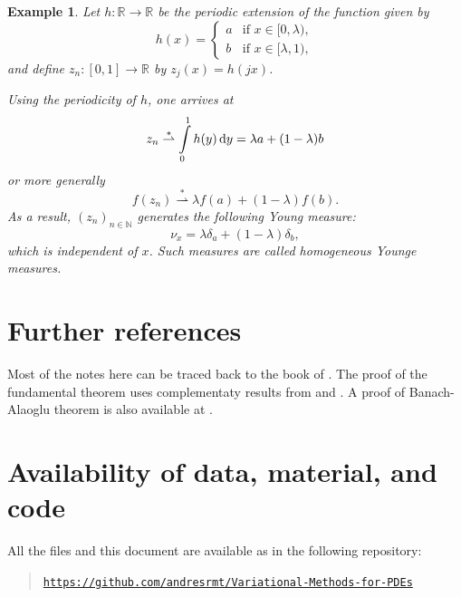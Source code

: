 \documentclass[a4paper,doc,11pt]{article}
\newtheorem{example}[theorem]{Example}
\newcommand{\R}{\mathbb{R}}
\newcommand{\N}{\mathbb{N}}
\begin{document}
\begin{example}
    Let \(h : \R \to \R\) be the periodic extension of the function given by
    \[
        h(x) = 
        \begin{cases}
            a & \text{if }x \in [0,\lambda),
            \\
            b & \text{if }x \in [\lambda,1),
        \end{cases}
    \]
    and define \(z_n : [0,1] \to \R\) by \( z_j(x) = h(jx)\). 
    
    Using the periodicity of \(h\), one arrives at
    \[
        z_n \overset{*}{\rightharpoonup} \int\limits_0^1 h(y) \dif y = \lambda a + (1-\lambda) b 
    \]
    or more generally 
    \[
        f(z_n) \overset{*}{\rightharpoonup} \lambda f(a) + (1-\lambda) f(b).
    \]
    As a result, \((z_n)_{n\in\N}\) generates the following Young measure:
    \[
        \nu_x = \lambda \delta_a + (1-\lambda) \delta_b,
    \]
    which is independent of \(x\). Such measures are called \emph{homogeneous Younge measures}.
\end{example}





\section*{Further references}

Most of the notes here can be traced back to the book of \citet{Mueller-1999}. The proof of the fundamental theorem uses complementaty results from \citet{Hungerbhler2011} and \citet{Balla-1989}. A proof of Banach-Alaoglu theorem is also available at \citet{Brezis2010}.






\section*{Availability of data, material, and code}
{

All the files and this document are available as in the following repository:
\begin{quote}
    \noindent \href{https://github.com/andresrmt/Variational-Methods-for-PDEs}{\texttt{https://github.com/andresrmt/Variational-Methods-for-PDEs}}
\end{quote}



}




\end{document}
